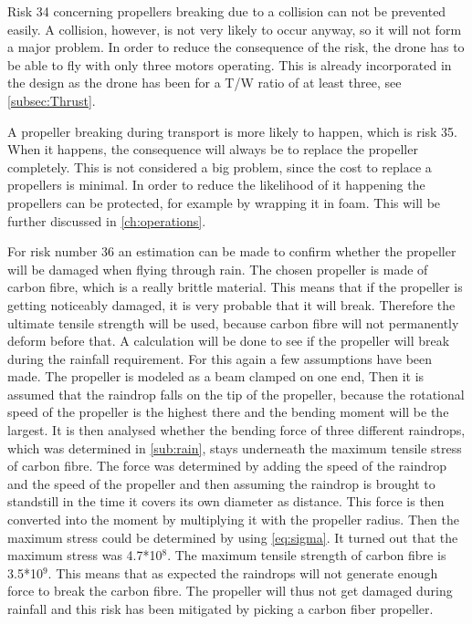 Risk 34 concerning propellers breaking due to a collision can not be prevented easily. A collision, however, is not very likely to occur anyway, so it will not form a major problem. In order to reduce the consequence of the risk, the drone has to be able to fly with only three motors operating. This is already incorporated in the design as the drone has been for a T/W ratio of at least three, see \autoref{subsec:Thrust}. 

A propeller breaking during transport is more likely to happen, which is risk 35. When it happens, the consequence will always be to replace the propeller completely. This is not considered a big problem, since the cost to replace a propellers is minimal. In order to reduce the likelihood of it happening the propellers can be protected, for example by wrapping it in foam. This will be further discussed in \autoref{ch:operations}.

For risk number 36 an estimation can be made to confirm whether the propeller will be damaged when flying through rain. The chosen propeller is made of carbon fibre, which is a really brittle material.  This means that if the propeller is getting noticeably damaged, it is very probable that it will break. Therefore the ultimate tensile strength will be used, because carbon fibre will not permanently deform before that. A calculation will be done to see if the propeller will break during the rainfall requirement. For this again a few assumptions have been made. The propeller is modeled as a beam clamped on one end, Then it is assumed that the raindrop falls on the tip of the propeller, because the rotational speed of the propeller is the highest there and the bending moment will be the largest. It is then analysed whether the bending force of three different raindrops, which was determined in \autoref{sub:rain}, stays underneath the maximum tensile stress of carbon fibre. The force was determined by adding the speed of the raindrop and the speed of the propeller and then assuming the raindrop is brought to standstill in the time it covers its own diameter as distance. This force is then converted into the moment by multiplying it with the propeller radius. Then the maximum stress could be determined by using \autoref{eq:sigma}. It turned out that the maximum stress was 4.7*10$^8$. The maximum tensile strength of carbon fibre is 3.5*10$^9$. This means that as expected the raindrops will not generate enough force to break the carbon fibre. The propeller will thus not get damaged during rainfall and this risk has been mitigated by picking a carbon fiber propeller. 
 
